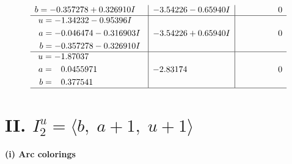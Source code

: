 \documentclass[1p]{elsarticle_modified}
\theoremstyle{definition}
\begin{document}
$$\begin{array}{c|c|c}
\begin{aligned}
b &= -0.357278 + 0.326910 I\end{aligned}
 & -3.54226 - 0.65940 I & \phantom{-0.000000 } 0 \\ \hline\begin{aligned}
u &= -1.34232 - 0.95396 I \\
a &= -0.046474 - 0.316903 I \\
b &= -0.357278 - 0.326910 I\end{aligned}
 & -3.54226 + 0.65940 I & \phantom{-0.000000 } 0 \\ \hline\begin{aligned}
u &= -1.87037\phantom{ +0.000000I} \\
a &= \phantom{-}0.0455971\phantom{ +0.000000I} \\
b &= \phantom{-}0.377541\phantom{ +0.000000I}\end{aligned}
 & -2.83174\phantom{ +0.000000I} & \phantom{-0.000000 } 0\\
 \hline 
 \end{array}$$\newpage\newpage\renewcommand{\arraystretch}{1}
\centering \section*{II. $I^u_{2}= \langle b,\;a+1,\;u+1 \rangle$}
\flushleft \textbf{(i) Arc colorings}\\
\end{document}

